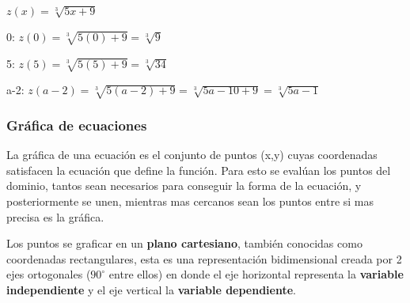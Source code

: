     $ z(x) = \sqrt[3]{5x+9}  $

    0:    $ z(0) = \sqrt[3]{5(0)+9}= \sqrt[3]{9}  $

    5:    $ z(5) = \sqrt[3]{5(5)+9}= \sqrt[3]{34}  $

    a-2:    $ z(a-2) = \sqrt[3]{5(a-2)+9}   = \sqrt[3]{5a-10+9} = \sqrt[3]{5a-1}$

   \subsubsection*{Gráfica de ecuaciones} \label{Grafica_de_ecuaciones}

    La gráfica de una ecuación es el conjunto de puntos (x,y) cuyas coordenadas
    satisfacen la ecuación que define la función. Para esto se evalúan los puntos
    del dominio, tantos sean necesarios para conseguir la forma de la
    ecuación, y posteriormente se unen, mientras mas cercanos sean los puntos entre
    si mas precisa es la gráfica.

    Los puntos se graficar en un \textbf{plano cartesiano}, también conocidas como
    coordenadas rectangulares, esta es una representación bidimensional creada
    por 2 ejes ortogonales ($90^{\circ}$ entre ellos) en donde el eje horizontal
    representa la \textbf{variable independiente} y el eje vertical la \textbf{variable
    dependiente}.



